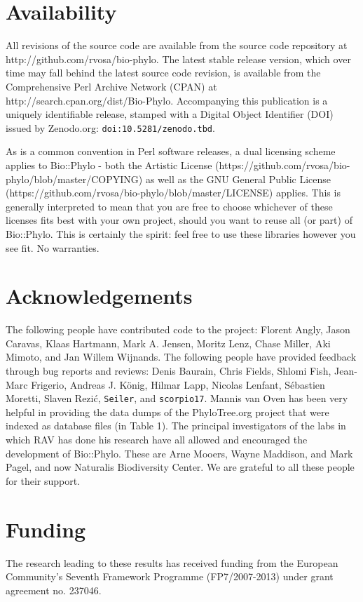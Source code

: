 \documentclass{bioinfo}
\begin{document}
\section{Availability}

All revisions of the source code are available from the source code repository at
http://github.com/rvosa/bio-phylo. The latest stable release version, which over time may
fall behind the latest source code revision, is available from the Comprehensive Perl 
Archive Network (CPAN) at http://search.cpan.org/dist/Bio-Phylo. Accompanying this 
publication is a uniquely identifiable release, stamped with a Digital Object Identifier 
(DOI) issued by Zenodo.org: \texttt{doi:10.5281/zenodo.tbd}.

As is a common convention in Perl software releases, a dual licensing scheme applies to
Bio::Phylo - both the Artistic License 
(https://github.com/rvosa/bio-phylo/blob/master/COPYING) as well as the GNU General Public 
License (https://github.com/rvosa/bio-phylo/blob/master/LICENSE) applies. This is 
generally interpreted to mean that you are free to choose whichever of these licenses fits 
best with your own project, should you want to reuse all (or part) of Bio::Phylo. This is 
certainly the spirit: feel free to use these libraries however you see fit. No warranties.

\section*{Acknowledgements}

The following people have contributed code to the project: Florent Angly, Jason Caravas, 
Klaas Hartmann, Mark A. Jensen, Moritz Lenz, Chase Miller, Aki Mimoto, and Jan Willem 
Wijnands. The following people have provided feedback through bug reports and reviews:
Denis Baurain, Chris Fields, Shlomi Fish, Jean-Marc Frigerio, Andreas J. König, Hilmar 
Lapp, Nicolas Lenfant, Sébastien Moretti, Slaven Rezić, \texttt{Seiler}, and
\texttt{scorpio17}. Mannis van Oven has been very helpful in providing the data dumps of
the PhyloTree.org project that were indexed as database files (in Table 1). The principal
investigators of the labs in which RAV has done his research have all allowed and 
encouraged the development of Bio::Phylo. These are Arne Mooers, Wayne Maddison, and Mark
Pagel, and now Naturalis Biodiversity Center. We are grateful to all these people for 
their support.

\section*{Funding}

The research leading to these results has received funding from the European Community's 
Seventh Framework Programme (FP7/2007-2013) under grant agreement no. 237046.




\end{document}
